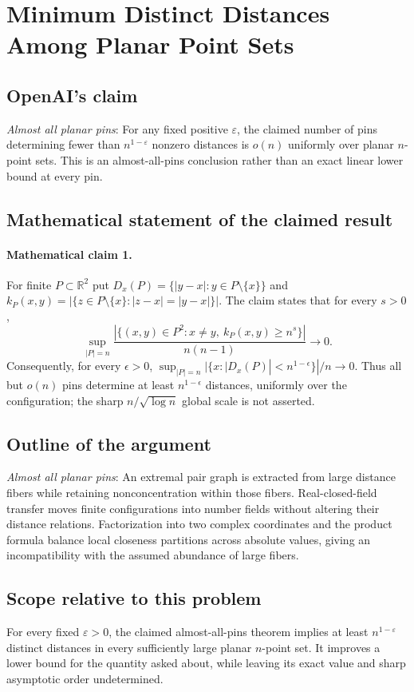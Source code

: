 \documentclass[11pt]{article}
\begin{document}
\section*{Minimum Distinct Distances Among Planar Point Sets}

\subsection{OpenAI's claim}
\textit{Almost all planar pins}: For any fixed positive $\varepsilon$, the claimed number of pins determining fewer than $n^{1-\varepsilon}$ nonzero distances is $o(n)$ uniformly over planar $n$-point sets. This is an almost-all-pins conclusion rather than an exact linear lower bound at every pin.

\subsection{Mathematical statement of the claimed result}
\paragraph{Mathematical claim 1.} For finite $P\subset\mathbb R^2$ put $D_x(P)=\{|y-x|:y\in P\setminus\{x\}\}$ and $k_P(x,y)=|\{z\in P\setminus\{x\}:|z-x|=|y-x|\}|$. The claim states that for every $s>0$, \[\sup_{|P|=n}\frac{|\{(x,y)\in P^2:x\ne y,\ k_P(x,y)\ge n^s\}|}{n(n-1)}\longrightarrow0.\] Consequently, for every $\epsilon>0$, $\sup_{|P|=n}|\{x:|D_x(P)|<n^{1-\epsilon}\}|/n\to0$. Thus all but $o(n)$ pins determine at least $n^{1-\epsilon}$ distances, uniformly over the configuration; the sharp $n/\sqrt{\log n}$ global scale is not asserted.

\subsection{Outline of the argument}
\textit{Almost all planar pins}: An extremal pair graph is extracted from large distance fibers while retaining nonconcentration within those fibers. Real-closed-field transfer moves finite configurations into number fields without altering their distance relations. Factorization into two complex coordinates and the product formula balance local closeness partitions across absolute values, giving an incompatibility with the assumed abundance of large fibers.

\subsection{Scope relative to this problem}
For every fixed $\varepsilon>0$, the claimed almost-all-pins theorem implies at least $n^{1-\varepsilon}$ distinct distances in every sufficiently large planar $n$-point set. It improves a lower bound for the quantity asked about, while leaving its exact value and sharp asymptotic order undetermined.
\end{document}
